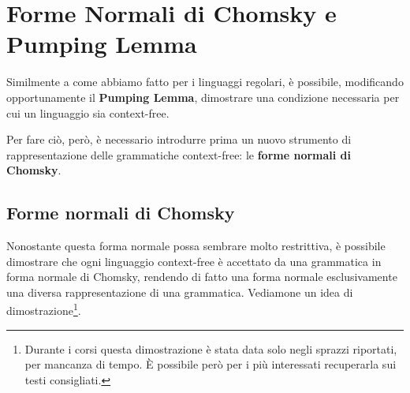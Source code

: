 \chapter{Forme Normali di Chomsky e Pumping Lemma}

Similmente a come abbiamo fatto per i linguaggi regolari, è possibile, modificando opportunamente il \textbf{Pumping Lemma}, dimostrare una condizione necessaria per cui un linguaggio sia context-free.

Per fare ciò, però, è necessario introdurre prima un nuovo strumento di rappresentazione delle grammatiche context-free: le \textbf{forme normali di Chomsky}.

\section{Forme normali di Chomsky}


Nonostante questa forma normale possa sembrare molto restrittiva, è possibile dimostrare che ogni linguaggio context-free è accettato da una grammatica in forma normale di Chomsky, rendendo di fatto una forma normale esclusivamente una diversa rappresentazione di una grammatica. Vediamone un idea di dimostrazione\footnote{ Durante i corsi questa dimostrazione è stata data solo negli sprazzi riportati, per mancanza di tempo. È possibile però per i più interessati recuperarla sui testi consigliati.}.

